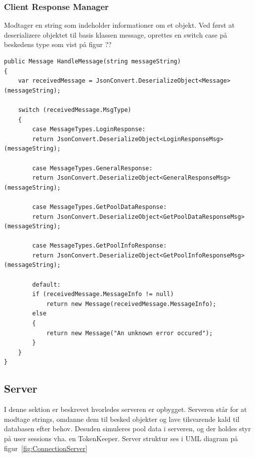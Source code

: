 \subsubsection{Client Response Manager}
Modtager en string som indeholder informationer om et objekt. Ved først at deserializere objektet til basis klassen message, oprettes en switch case på beskedens type som vist på figur ??
\begin{lstlisting}[caption=Client.HandleMessage, label=code:Client.HandleMessage]
public Message HandleMessage(string messageString)
{
	var receivedMessage = JsonConvert.DeserializeObject<Message>(messageString);
	
	switch (receivedMessage.MsgType)
	{
		case MessageTypes.LoginResponse:
		return JsonConvert.DeserializeObject<LoginResponseMsg>(messageString);
		
		case MessageTypes.GeneralResponse:
		return JsonConvert.DeserializeObject<GeneralResponseMsg>(messageString);
		
		case MessageTypes.GetPoolDataResponse:
		return JsonConvert.DeserializeObject<GetPoolDataResponseMsg>(messageString);
		
		case MessageTypes.GetPoolInfoResponse:
		return JsonConvert.DeserializeObject<GetPoolInfoResponseMsg>(messageString);
		
		default:
		if (receivedMessage.MessageInfo != null)
			return new Message(receivedMessage.MessageInfo);
		else
		{
			return new Message("An unknown error occured");
		}
	}
}
\end{lstlisting}

\subsection{Server}
I denne sektion er beskrevet hvorledes serveren er opbygget. Serveren står for at modtage strings, omdanne dem til besked objekter og lave tilsvarende kald til databasen efter behov. Desuden simuleres pool data i serveren, og der holdes styr på user sessions vha. en TokenKeeper. Server struktur ses i UML diagram på figur~\ref{fig:ConnectionServer}

